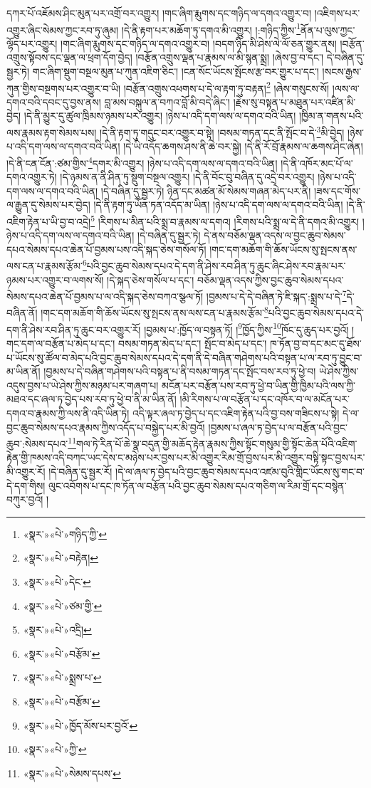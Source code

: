 དཀར་པོ་འཇོམས་ཤིང་མུན་པར་འགྲོ་བར་འགྱུར། །གང་ཞིག་རྨུགས་དང་གཉིད་ལ་དགའ་འགྱུར་བ། །འཇིགས་པར་འགྱུར་ཞིང་སེམས་ཀྱང་རབ་ཏུ་ཞུམ། །དེ་ནི་རྟག་པར་མཆོག་ཏུ་དགའ་མི་འགྱུར། །:གཉིད་ཀྱིས་\footnote{«སྣར་»«པེ་»གཉིད་ཀྱི་}ནོན་པ་ལུས་ཀྱང་ལྷོད་པར་འགྱུར། །གང་ཞིག་རྨུགས་དང་གཉིད་ལ་དགའ་འགྱུར་བ། །བདག་ཉིད་མི་ཤེས་ལེ་ལོ་ཅན་གྱུར་ནས། །བརྩོན་འགྲུས་སྟོབས་དང་ལྡན་ལ་ཕྲག་དོག་བྱེད། །བརྩོན་འགྲུས་ལྡན་པ་རྣམས་ལ་མི་སྙན་སྨྲ། །ཞེས་བྱ་བ་དང་། དེ་བཞིན་དུ་སྦྱར་ཏེ། གང་ཞིག་སྡུག་བསྔལ་མུན་པ་ཀུན་འཇིག་ཅིང་། །ངན་སོང་ཡོངས་སྤོངས་རྩ་བར་གྱུར་པ་དང་། །སངས་རྒྱས་ཀུན་གྱིས་བསྔགས་པར་འགྱུར་བ་ཡི། །བརྩོན་འགྲུས་འཕགས་པ་དེ་ལ་རྟག་ཏུ་བརྟན།\footnote{«སྣར་»«པེ་»བརྟེན།} །ཞེས་གསུངས་སོ། །ལས་ལ་དགའ་བའི་དབང་དུ་བྱས་ནས། བླ་མས་བསྐུལ་ན་བཀའ་བློ་མི་བདེ་ཞིང་། །རྗེས་སུ་བསྟན་པ་མཐུན་པར་འཛིན་མི་བྱེད། །དེ་ནི་མྱུར་དུ་ཚུལ་ཁྲིམས་ཉམས་པར་འགྱུར། །ཉེས་པ་འདི་དག་ལས་ལ་དགའ་བའི་ཡིན། །ཁྱིམ་ན་གནས་པའི་ལས་རྣམས་རྟག་སེམས་པས། །དེ་ནི་རྟག་ཏུ་གདུང་བར་འགྱུར་བ་སྟེ། །བསམ་གཏན་དང་ནི་སྤོང་བ་དེ་\footnote{«སྣར་»«པེ་»དེང་}མི་བྱེད། །ཉེས་པ་འདི་དག་ལས་ལ་དགའ་བའི་ཡིན། །དེ་ཡི་འདོད་ཆགས་ཤས་ནི་ཆེ་བར་སྐྱེ། །དེ་ནི་རོ་བྲོ་རྣམས་ལ་ཆགས་ཤིང་ཞེན། །དེ་ནི་ངན་ངོན་:ཙམ་གྱིས་\footnote{«སྣར་»«པེ་»ཙམ་གྱི་}དགར་མི་འགྱུར། །ཉེས་པ་འདི་དག་ལས་ལ་དགའ་བའི་ཡིན། །དེ་ནི་འཁོར་མང་པོ་ལ་དགའ་འགྱུར་ཏེ། །དེ་ཉམས་ན་ནི་ཤིན་ཏུ་སྡུག་བསྔལ་འགྱུར། །དེ་ནི་བོང་བུ་བཞིན་དུ་འདྲེ་བར་འགྱུར། །ཉེས་པ་འདི་དག་ལས་ལ་དགའ་བའི་ཡིན། །དེ་བཞིན་དུ་སྦྱར་ཏེ། ཉིན་དང་མཚན་མོ་སེམས་གཞན་མེད་པར་ནི། །ཟས་དང་གོས་ལ་རྒྱུན་དུ་སེམས་པར་བྱེད། །དེ་ནི་རྟག་ཏུ་ཡོན་ཏན་འདོད་མ་ཡིན། །ཉེས་པ་འདི་དག་ལས་ལ་དགའ་བའི་ཡིན། །དེ་ནི་འཇིག་རྟེན་པ་ཡི་བྱ་བ་འདྲེ།\footnote{«སྣར་»«པེ་»འདྲི།} །རིགས་པ་མིན་པའི་སྨྲ་བ་རྣམས་ལ་དགའ། །རིགས་པའི་སྨྲ་ལ་དེ་ནི་དགའ་མི་འགྱུར། །ཉེས་པ་འདི་དག་ལས་ལ་དགའ་བའི་ཡིན། །དེ་བཞིན་དུ་སྦྱར་ཏེ། དེ་ནས་བཅོམ་ལྡན་འདས་ལ་བྱང་ཆུབ་སེམས་དཔའ་སེམས་དཔའ་ཆེན་པོ་བྱམས་པས་འདི་སྐད་ཅེས་གསོལ་ཏོ། །གང་དག་མཆོག་གི་ཆོས་ཡོངས་སུ་སྤངས་ནས་ལས་ངན་པ་རྣམས་རྩོམ་\footnote{«སྣར་»«པེ་»བརྩོམ་}པའི་བྱང་ཆུབ་སེམས་དཔའ་དེ་དག་ནི་ཤེས་རབ་ཤིན་ཏུ་ཆུང་ཞིང་ཤེས་རབ་རྣམ་པར་ཉམས་པར་འགྱུར་བ་ལགས་སོ། །དེ་སྐད་ཅེས་གསོལ་པ་དང་། བཅོམ་ལྡན་འདས་ཀྱིས་བྱང་ཆུབ་སེམས་དཔའ་སེམས་དཔའ་ཆེན་པོ་བྱམས་པ་ལ་འདི་སྐད་ཅེས་བཀའ་སྩལ་ཏོ། །བྱམས་པ་དེ་དེ་བཞིན་ཏེ་ཇི་སྐད་:སྨྲས་པ་དེ་\footnote{«སྣར་»«པེ་»སྨྲས་པ་}དེ་བཞིན་ནོ། །གང་དག་མཆོག་གི་ཆོས་ཡོངས་སུ་སྤངས་ནས་ལས་ངན་པ་རྣམས་རྩོམ་\footnote{«སྣར་»«པེ་»བརྩོམ་}པའི་བྱང་ཆུབ་སེམས་དཔའ་དེ་དག་ནི་ཤེས་རབ་ཤིན་ཏུ་ཆུང་བར་འགྱུར་རོ། །བྱམས་པ་:ཁྱོད་ལ་བསྟན་ཏོ། །\footnote{«སྣར་»«པེ་»ཁྱོད་མོས་པར་བྱའོ་}ཁྱོད་ཀྱིས་\footnote{«སྣར་»«པེ་»ཀྱི་}ཁོང་དུ་ཆུད་པར་བྱའོ། །གང་དག་ལ་བརྩོན་པ་མེད་པ་དང་། བསམ་གཏན་མེད་པ་དང་། སྤོང་བ་མེད་པ་དང་། ཁ་ཏོན་བྱ་བ་དང་མང་དུ་ཐོས་པ་ཡོངས་སུ་ཚོལ་བ་མེད་པའི་བྱང་ཆུབ་སེམས་དཔའ་དེ་དག་ནི་དེ་བཞིན་གཤེགས་པའི་བསྟན་པ་ལ་རབ་ཏུ་བྱུང་བ་མ་ཡིན་ནོ། །བྱམས་པ་དེ་བཞིན་གཤེགས་པའི་བསྟན་པ་ནི་བསམ་གཏན་དང་སྤོང་བས་རབ་ཏུ་ཕྱེ་བ། ཡེ་ཤེས་ཀྱིས་འདུས་བྱས་པ་ཡེ་ཤེས་ཀྱིས་མཉམ་པར་གཞག་པ། མངོན་པར་བརྩོན་པས་རབ་ཏུ་ཕྱེ་བ་ཡིན་གྱི་ཁྱིམ་པའི་ལས་ཀྱི་མཐའ་དང་ཞལ་ཏ་བྱེད་པས་རབ་ཏུ་ཕྱེ་བ་ནི་མ་ཡིན་ནོ། །མི་རིགས་པ་ལ་བརྩོན་པ་དང་འཁོར་བ་ལ་མངོན་པར་དགའ་བ་རྣམས་ཀྱི་ལས་ནི་འདི་ཡིན་ཏེ། འདི་ལྟར་ཞལ་ཏ་བྱེད་པ་དང་འཇིག་རྟེན་པའི་བྱ་བས་གཟིངས་པ་སྟེ། དེ་ལ་བྱང་ཆུབ་སེམས་དཔའ་རྣམས་ཀྱིས་འདོད་པ་བསྐྱེད་པར་མི་བྱའོ། །བྱམས་པ་ཞལ་ཏ་བྱེད་པ་ལ་བརྩོན་པའི་བྱང་ཆུབ་:སེམས་དཔའ་\footnote{«སྣར་»«པེ་»སེམས་དཔས་}གལ་ཏེ་རིན་པོ་ཆེ་སྣ་བདུན་གྱི་མཆོད་རྟེན་རྣམས་ཀྱིས་སྟོང་གསུམ་གྱི་སྟོང་ཆེན་པོའི་འཇིག་རྟེན་གྱི་ཁམས་འདི་བཀང་ཡང་དེས་ང་མཉེས་པར་བྱས་པར་མི་འགྱུར་རིམ་གྲོ་བྱས་པར་མི་འགྱུར་བསྟི་སྟང་བྱས་པར་མི་འགྱུར་རོ། །དེ་བཞིན་དུ་སྦྱར་རོ། །དེ་ལ་ཞལ་ཏ་བྱེད་པའི་བྱང་ཆུབ་སེམས་དཔའ་འཛམ་བུའི་གླིང་ཡོངས་སུ་གང་བ་དེ་དག་གིས། ལུང་འབོགས་པ་དང་ཁ་ཏོན་ལ་བརྩོན་པའི་བྱང་ཆུབ་སེམས་དཔའ་གཅིག་ལ་རིམ་གྲོ་དང་བསྙེན་བཀུར་བྱའོ། །
